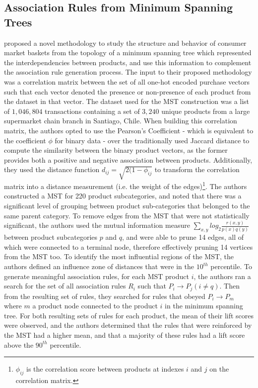 \subsection{Association Rules from Minimum Spanning Trees}
\label{sec:mst paper}
 proposed a novel methodology to study the structure and behavior of consumer market baskets from the topology of a minimum spanning tree which represented the interdependencies between products, and use this information to complement the association rule generation process. The input to their proposed methodology was a correlation matrix between the set of all one-hot encoded purchase vectors such that each vector denoted the presence or non-presence of each product from the dataset in that vector.  The dataset used for the MST construction was a list of $1,046,804$ transactions containing a set of $3,240$ unique products from a large supermarket chain branch in Santiago, Chile.  When building this correlation matrix, the authors opted to use the Pearson's Coefficient  - which is equivalent to the coefficient $\phi$ for binary data  - over the traditionally used Jaccard distance to compute the similarity between the binary product vectors, as the former provides both a positive and negative association between products. Additionally,  they used the distance function $d_{ij} = \sqrt{2(1-\phi_{ij}}$ to transform the correlation matrix into a distance measurement (i.e. the weight of the edges)\footnote{$\phi_{ij}$ is the correlation score between products at indexes $i$ and $j$ on the correlation matrix.}.  The authors constructed a MST for 220 product subcategories, and noted that there was a significant level of grouping between product sub-categories that belonged to the same parent category.  To remove edges from the MST that were not statistically significant,  the authors used the mutual information  measure $\sum\limits_{x,y}log_2 \frac{r(x,y)}{p(x)q(y)}$ between product subcategories $p$ and $q$, and were able to prune 14 edges, all of which were connected to a terminal node, therefore effectively pruning 14 vertices from the MST too. To identify the most influential regions of the MST, the authors defined an influence zone of distances that were in the $10^{th}$ percentile. To generate meaningful association rules,  for each MST product $i$, the authors ran a search for the set of all association rules $R_i$ such that $P_i \rightarrow P_j (i \neq q)$. Then from the resulting set of rules, they searched for rules that obeyed $P_i \rightarrow P_m$ where $m$ a product node connected to the product $i$ in the minimum spanning tree.  For both resulting sets of rules for each product, the mean of their lift scores were observed, and the authors determined that the rules that were reinforced by the MST had a higher mean, and that a majority of these rules had a lift score above the $90^{th}$ percentile. 

